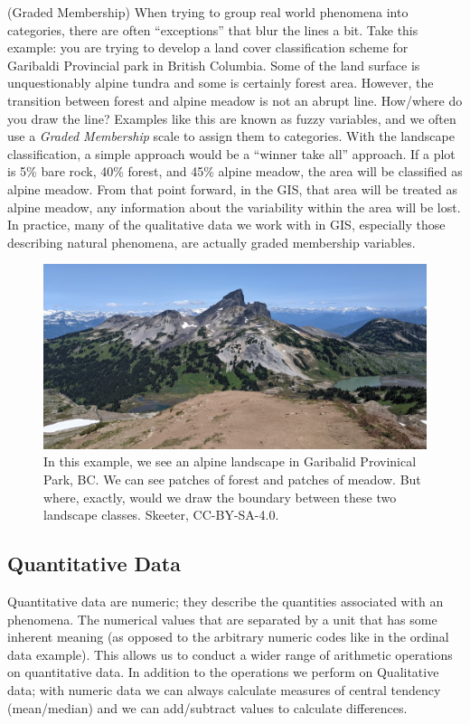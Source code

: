 \documentclass[
]{book}
\begin{document}
(Graded Membership) When trying to group real world phenomena into categories, there are often ``exceptions'' that blur the lines a bit. Take this example: you are trying to develop a land cover classification scheme for Garibaldi Provincial park in British Columbia. Some of the land surface is unquestionably alpine tundra and some is certainly forest area. However, the transition between forest and alpine meadow is not an abrupt line. How/where do you draw the line? Examples like this are known as fuzzy variables, and we often use a \emph{Graded Membership} scale to assign them to categories. With the landscape classification, a simple approach would be a ``winner take all'' approach. If a plot is 5\% bare rock, 40\% forest, and 45\% alpine meadow, the area will be classified as alpine meadow. From that point forward, in the GIS, that area will be treated as alpine meadow, any information about the variability within the area will be lost. In practice, many of the qualitative data we work with in GIS, especially those describing natural phenomena, are actually graded membership variables.

\begin{figure}
\includegraphics[width=0.75\linewidth]{images/03-fuzzy} \caption{In this example, we see an alpine landscape in Garibalid Provinical Park, BC.  We can see patches of forest and patches of meadow.  But where, exactly, would we draw the boundary between these two landscape classes. Skeeter, CC-BY-SA-4.0.}\label{fig:3-fuzzy}
\end{figure}

\hypertarget{quantitative-data}{%
\subsection{Quantitative Data}\label{quantitative-data}}

Quantitative data are numeric; they describe the quantities associated with an phenomena. The numerical values that are separated by a unit that has some inherent meaning (as opposed to the arbitrary numeric codes like in the ordinal data example). This allows us to conduct a wider range of arithmetic operations on quantitative data. In addition to the operations we perform on Qualitative data; with numeric data we can always calculate measures of central tendency (mean/median) and we can add/subtract values to calculate differences.
\end{document}
